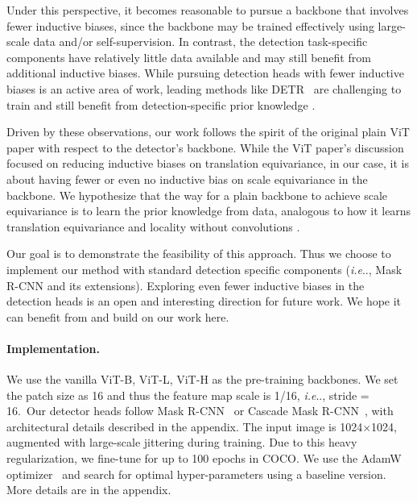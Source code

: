 \documentclass[runningheads]{llncs}
\makeatletter
\DeclareRobustCommand\onedot{\futurelet\@let@token\@onedot}
\def\@onedot{\ifx\@let@token.\else.\null\fi\xspace}
\def\ie{\emph{i.e}\onedot} \def\Ie{\emph{I.e}\onedot}
\makeatother
\begin{document}
Under this perspective, it becomes reasonable to pursue a backbone that involves fewer inductive biases, since the backbone may be trained effectively using large-scale data and/or self-supervision. In contrast, the detection task-specific components have relatively little data available and may still benefit from additional inductive biases. While pursuing detection heads with fewer inductive biases is an active area of work, leading methods like DETR~\cite{Carion2020} are challenging to train and still benefit from detection-specific prior knowledge \cite{Zhu2020}.

Driven by these observations, our work follows the spirit of the original plain ViT paper with respect to the detector's backbone. While the ViT paper's discussion \cite{Dosovitskiy2021} focused on reducing inductive biases on translation equivariance, in our case, it is about having fewer or even no inductive bias on scale equivariance in the backbone. We hypothesize that the way for a plain backbone to achieve scale equivariance is to learn the prior knowledge from data, analogous to how it learns translation equivariance and locality without convolutions \cite{Dosovitskiy2021}.

Our goal is to demonstrate the feasibility of this approach. Thus we choose to implement our method with standard detection specific components (\ie, Mask R-CNN and its extensions). Exploring even fewer inductive biases in the detection heads is an open and interesting direction for future work. We hope it can benefit from and build on our work here.

\paragraph{Implementation.} We use the vanilla ViT-B, ViT-L, ViT-H \cite{Dosovitskiy2021} as the pre-training backbones. We set the patch size as 16 and thus the feature map scale is 1/16, \ie, stride = 16.\footnotemark~Our detector heads follow Mask R-CNN~\cite{He2017} or Cascade Mask R-CNN~\cite{Cai2019}, with architectural details described in the appendix.
The input image is 1024$\times$1024, augmented with large-scale jittering \cite{Ghiasi2021} during training.
Due to this heavy regularization, we fine-tune for up to 100 epochs in COCO.
We use the AdamW optimizer~\cite{Loshchilov2019} and search for optimal hyper-parameters using a baseline version. More details are in the appendix.

\end{document}
